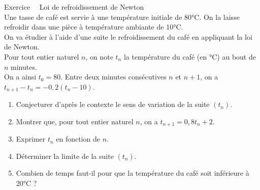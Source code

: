 \documentclass[a4paper,11pt,eval]{nsi}
\newcounter{exoNum}
\newcommand{\exo}[1]
{
	\addtocounter{exoNum}{1}
	{\titlefont\color{UGLiBlue}\Large Exercice\ \theexoNum\ \normalsize{#1}}\smallskip	
}
\begin{document}
\exo{ Loi de refroidissement de Newton}\\
Une tasse de café est servie à une température initiale de 80°C. On la laisse refroidir dans une pièce à température ambiante de 10°C.\\
On va étudier à l'aide d'une suite le refroidissement du café en appliquant la loi de Newton.\\

Pour tout entier naturel $n$, on note $t_n$ la température du café (en °C) au bout de $n$ minutes.\\
On a ainsi $t_0=80$. Entre deux minutes consécutives $n$ et $n+1$, on a $t_{n+1}-t_n=-0,2(t_n-10)$.
\begin{enumerate}
    \item Conjecturer d'après le contexte le sens de variation de la suite $(t_n)$.
    \item Montrer que, pour tout entier naturel $n$, on a $t_{n+1}=0,8t_n+2$.
    \item Exprimer $t_n$ en fonction de $n$.
    \item Déterminer la limite de la suite $(t_n)$.
    \item \faCalculator \hspace*{.2cm} Combien de temps faut-il pour que la température du café soit inférieure à 20°C ?
\end{enumerate}

\end{document}
